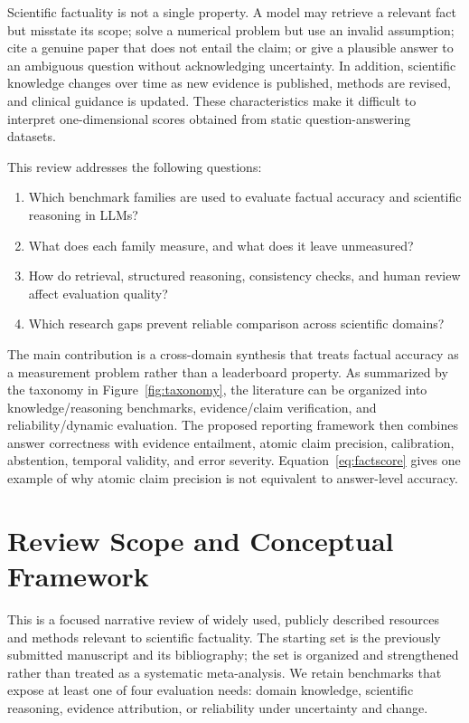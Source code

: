 \documentclass[manuscript,nonacm]{acmart}
\begin{document}
Scientific factuality is not a single property. A model may retrieve a relevant fact but misstate its scope; solve a numerical problem but use an invalid assumption; cite a genuine paper that does not entail the claim; or give a plausible answer to an ambiguous question without acknowledging uncertainty. In addition, scientific knowledge changes over time as new evidence is published, methods are revised, and clinical guidance is updated. These characteristics make it difficult to interpret one-dimensional scores obtained from static question-answering datasets.

This review addresses the following questions:
\begin{enumerate}[leftmargin=*,itemsep=1pt,topsep=2pt]
    \item Which benchmark families are used to evaluate factual accuracy and scientific reasoning in LLMs?
    \item What does each family measure, and what does it leave unmeasured?
    \item How do retrieval, structured reasoning, consistency checks, and human review affect evaluation quality?
    \item Which research gaps prevent reliable comparison across scientific domains?
\end{enumerate}

The main contribution is a cross-domain synthesis that treats factual accuracy as a measurement problem rather than a leaderboard property. As summarized by the taxonomy in Figure~\ref{fig:taxonomy}, the literature can be organized into knowledge/reasoning benchmarks, evidence/claim verification, and reliability/dynamic evaluation. The proposed reporting framework then combines answer correctness with evidence entailment, atomic claim precision, calibration, abstention, temporal validity, and error severity. Equation~\ref{eq:factscore} gives one example of why atomic claim precision is not equivalent to answer-level accuracy.

\section{Review Scope and Conceptual Framework}\label{sec:scope}
This is a focused narrative review of widely used, publicly described resources and methods relevant to scientific factuality. The starting set is the previously submitted manuscript and its bibliography; the set is organized and strengthened rather than treated as a systematic meta-analysis. We retain benchmarks that expose at least one of four evaluation needs: domain knowledge, scientific reasoning, evidence attribution, or reliability under uncertainty and change.
\end{document}
